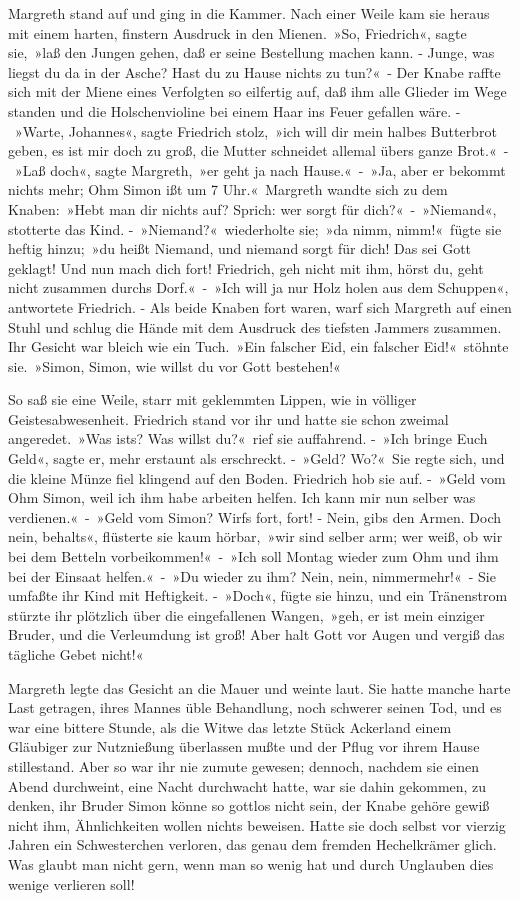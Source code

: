 Margreth stand auf und ging in die Kammer. Nach einer Weile kam sie heraus mit einem harten, finstern Ausdruck in den Mienen. »So, Friedrich«, sagte sie, »laß den Jungen gehen, daß er seine Bestellung machen kann. - Junge, was liegst du da in der Asche? Hast du zu Hause nichts zu tun?« - Der Knabe raffte sich mit der Miene eines Verfolgten so eilfertig auf, daß ihm alle Glieder im Wege standen und die Holschenvioline bei einem Haar ins Feuer gefallen wäre. - »Warte, Johannes«, sagte Friedrich stolz, »ich will dir mein halbes Butterbrot geben, es ist mir doch zu groß, die Mutter schneidet allemal übers ganze Brot.« - »Laß doch«, sagte Margreth, »er geht ja nach Hause.« - »Ja, aber er bekommt nichts mehr; Ohm Simon ißt um 7 Uhr.« Margreth wandte sich zu dem Knaben: »Hebt man dir nichts auf? Sprich: wer sorgt für dich?« - »Niemand«, stotterte das Kind. - »Niemand?« wiederholte sie; »da nimm, nimm!« fügte sie heftig hinzu; »du heißt Niemand, und niemand sorgt für dich! Das sei Gott geklagt! Und nun mach dich fort! Friedrich, geh nicht mit ihm, hörst du, geht nicht zusammen durchs Dorf.« - »Ich will ja nur Holz holen aus dem Schuppen«, antwortete Friedrich. - Als beide Knaben fort waren, warf sich Margreth auf einen Stuhl und schlug die Hände mit dem Ausdruck des tiefsten Jammers zusammen. Ihr Gesicht war bleich wie ein Tuch. »Ein falscher Eid, ein falscher Eid!« stöhnte sie. »Simon, Simon, wie willst du vor Gott bestehen!«

So saß sie eine Weile, starr mit geklemmten Lippen, wie in völliger Geistesabwesenheit. Friedrich stand vor ihr und hatte sie schon zweimal angeredet. »Was ists? Was willst du?« rief sie auffahrend. - »Ich bringe Euch Geld«, sagte er, mehr erstaunt als erschreckt. - »Geld? Wo?« Sie regte sich, und die kleine Münze fiel klingend auf den Boden. Friedrich hob sie auf. - »Geld vom Ohm Simon, weil ich ihm habe arbeiten helfen. Ich kann mir nun selber was verdienen.« - »Geld vom Simon? Wirfs fort, fort! - Nein, gibs den Armen. Doch nein, behalts«, flüsterte sie kaum hörbar, »wir sind selber arm; wer weiß, ob wir bei dem Betteln vorbeikommen!« - »Ich soll Montag wieder zum Ohm und ihm bei der Einsaat helfen.« - »Du wieder zu ihm? Nein, nein, nimmermehr!« - Sie umfaßte ihr Kind mit Heftigkeit. - »Doch«, fügte sie hinzu, und ein Tränenstrom stürzte ihr plötzlich über die eingefallenen Wangen, »geh, er ist mein einziger Bruder, und die Verleumdung ist groß! Aber halt Gott vor Augen und vergiß das tägliche Gebet nicht!«

Margreth legte das Gesicht an die Mauer und weinte laut. Sie hatte manche harte Last getragen, ihres Mannes üble Behandlung, noch schwerer seinen Tod, und es war eine bittere Stunde, als die Witwe das letzte Stück Ackerland einem Gläubiger zur Nutznießung überlassen mußte und der Pflug vor ihrem Hause stillestand. Aber so war ihr nie zumute gewesen; dennoch, nachdem sie einen Abend durchweint, eine Nacht durchwacht hatte, war sie dahin gekommen, zu denken, ihr Bruder Simon könne so gottlos nicht sein, der Knabe gehöre gewiß nicht ihm, Ähnlichkeiten wollen nichts beweisen. Hatte sie doch selbst vor vierzig Jahren ein Schwesterchen verloren, das genau dem fremden Hechelkrämer glich. Was glaubt man nicht gern, wenn man so wenig hat und durch Unglauben dies wenige verlieren soll!

